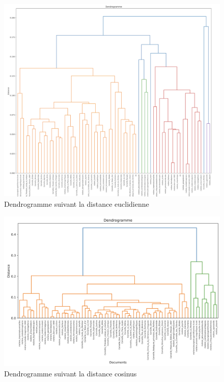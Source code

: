 \begin{figure}[htbp]
  \centering
  \includegraphics[width=15cm]{Ressources/Dendo_eucli.png}
  \caption{Dendrogramme suivant la distance euclidienne}
  \label{fig:images}
\end{figure}

\newpage
\begin{figure}[htbp]
  \centering
  \includegraphics[width=15cm]{Ressources/Dendo_cos.png}
  \caption{Dendrogramme suivant la distance cosinus}
  \label{fig:images}
\end{figure}

